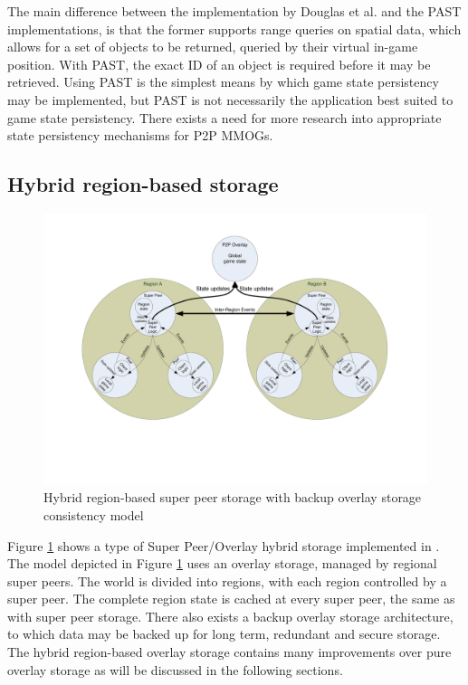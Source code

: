 \documentclass[10pt,a4paper,journal,cspaper,compsoc]{IEEEtran}
\begin{document}
The main difference between the implementation by Douglas et al. and the PAST implementations, is that the former supports range queries on spatial
data, which allows for a set of objects to be returned, queried by their virtual in-game position. With PAST, the exact ID of an object is required
before it may be retrieved. Using PAST is the simplest means by which game state persistency may be implemented, but PAST is not necessarily the
application best suited to game state persistency. There exists a need for more research into appropriate state persistency mechanisms for P2P MMOGs.

\subsection{Hybrid region-based storage}
\label{hybrid_storage}

\begin{figure}[htbp]
 \centering
 \includegraphics[clip=true, viewport=2cm 5cm 27cm 19.5cm, width=\textwidth]{region_based_CS_CM_P2PO}
 \caption{Hybrid region-based super peer storage with backup overlay storage consistency model}
 \label{fig_cs_region_o_cm}
\end{figure}
%
Figure \ref{fig_cs_region_o_cm} shows a type of Super Peer/Overlay hybrid storage implemented in \cite{zoned_federation}. The model depicted in
Figure \ref{fig_cs_region_o_cm} uses an overlay storage, managed by regional super peers. The world is divided into regions, with each region
controlled by a super peer. The complete region state is cached at every super peer, the same as with super peer storage. There also exists a backup
overlay storage architecture, to which data may be backed up for long term, redundant and secure storage. The hybrid region-based overlay storage
contains many improvements over pure overlay storage as will be discussed in the following sections.
\end{document}
